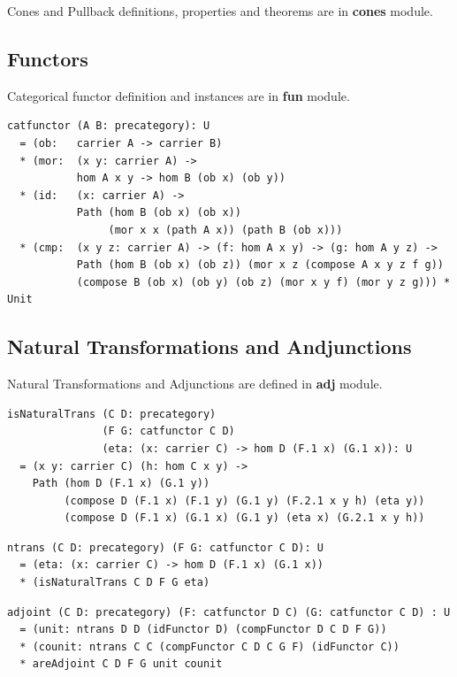 \documentclass{article}
\begin{document}
Cones and Pullback definitions, properties and theorems are in {\bf cones} module.

\subsection{Functors}

Categorical functor definition and instances are in {\bf fun} module.

\begin{lstlisting}[mathescape=true]
catfunctor (A B: precategory): U
  = (ob:   carrier A -> carrier B)
  * (mor:  (x y: carrier A) ->
           hom A x y -> hom B (ob x) (ob y))
  * (id:   (x: carrier A) ->
           Path (hom B (ob x) (ob x))
                (mor x x (path A x)) (path B (ob x)))
  * (cmp:  (x y z: carrier A) -> (f: hom A x y) -> (g: hom A y z) ->
           Path (hom B (ob x) (ob z)) (mor x z (compose A x y z f g))
           (compose B (ob x) (ob y) (ob z) (mor x y f) (mor y z g))) * Unit
\end{lstlisting}

\subsection{Natural Transformations and Andjunctions}

Natural Transformations and Adjunctions are defined in {\bf adj} module.

\begin{lstlisting}[mathescape=true]
isNaturalTrans (C D: precategory)
               (F G: catfunctor C D)
               (eta: (x: carrier C) -> hom D (F.1 x) (G.1 x)): U
  = (x y: carrier C) (h: hom C x y) ->
    Path (hom D (F.1 x) (G.1 y))
         (compose D (F.1 x) (F.1 y) (G.1 y) (F.2.1 x y h) (eta y))
         (compose D (F.1 x) (G.1 x) (G.1 y) (eta x) (G.2.1 x y h))
\end{lstlisting}

\begin{lstlisting}[mathescape=true]
ntrans (C D: precategory) (F G: catfunctor C D): U
  = (eta: (x: carrier C) -> hom D (F.1 x) (G.1 x))
  * (isNaturalTrans C D F G eta)
\end{lstlisting}

\begin{lstlisting}[mathescape=true]
adjoint (C D: precategory) (F: catfunctor D C) (G: catfunctor C D) : U
  = (unit: ntrans D D (idFunctor D) (compFunctor D C D F G))
  * (counit: ntrans C C (compFunctor C D C G F) (idFunctor C))
  * areAdjoint C D F G unit counit
\end{lstlisting}
\end{document}
